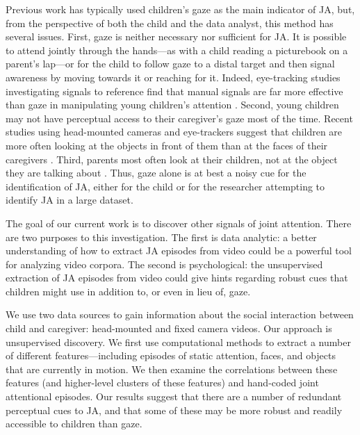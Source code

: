 \documentclass[10pt,letterpaper]{article}
\begin{document}
Previous work has typically used children's gaze as the main indicator of JA, but, from the perspective of both the child and the data analyst, this method has several issues. First, gaze is neither necessary nor sufficient for JA. It is possible to attend jointly through the hands---as with a child reading a picturebook on a parent's lap---or for the child to follow gaze to a distal target and then signal awareness by moving towards it or reaching for it. Indeed, eye-tracking studies investigating signals to reference find that manual signals are far more effective than gaze in manipulating young children's attention \cite{yurovsky2013}. Second, young children may not have perceptual access to their caregiver's gaze most of the time. Recent studies using head-mounted cameras and eye-trackers suggest that children are more often looking at the objects in front of them than at the faces of their caregivers \cite{smith2011,franchak2011,frank2013}. Third, parents most often look at their children, not at the object they are talking about \cite{frank2013b}. Thus, gaze alone is at best a noisy cue for the identification of JA, either for the child or for the researcher attempting to identify JA in a large dataset.

The goal of our current work is to discover other signals of joint attention. There are two purposes to this investigation. The first is data analytic: a better understanding of how to extract JA episodes from video could be a powerful tool for analyzing video corpora. The second is psychological: the unsupervised extraction of JA episodes from video could give hints regarding robust cues that children might use in addition to, or even in lieu of, gaze. 

We use two data sources to gain information about the social interaction between child and caregiver: head-mounted and fixed camera videos. Our approach is unsupervised discovery. We first use computational methods to extract a number of different features---including episodes of static attention, faces, and objects that are currently in motion. We then  examine the correlations between these features (and higher-level clusters of these features) and hand-coded joint attentional episodes. Our results suggest that there are a number of redundant perceptual cues to JA, and that some of these may be more robust and readily accessible to children than gaze.

\end{document}
